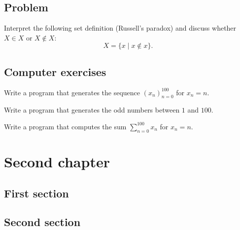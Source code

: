 \documentclass{tstextbook}
\begin{document}
    \section*{Problem}

    \begin{problem}
        Interpret the following set definition (Russell's paradox) and discuss
        whether $X \in X$ or $X \notin X$:
        \begin{equation}
            X = \{x \mid x \notin x\}.
        \end{equation}
    \end{problem}

    \section*{Computer exercises}

    \begin{programming}
        Write a program that generates the sequence $(x_n)_{n=0}^{100}$
        for $x_n = n$.
    \end{programming}

    \begin{programming}
        Write a program that generates the odd numbers between $1$ and $100$.
    \end{programming}

    \begin{programming}
        Write a program that computes the sum $\sum_{n=0}^{100} x_n$
        for $x_n = n$.
    \end{programming}

    \chapter{Second chapter}

    \begin{summary}
        \blindtext
    \end{summary}

    \section{First section}
    \Blindtext

    \section{Second section}
    \Blindtext
\end{document}
